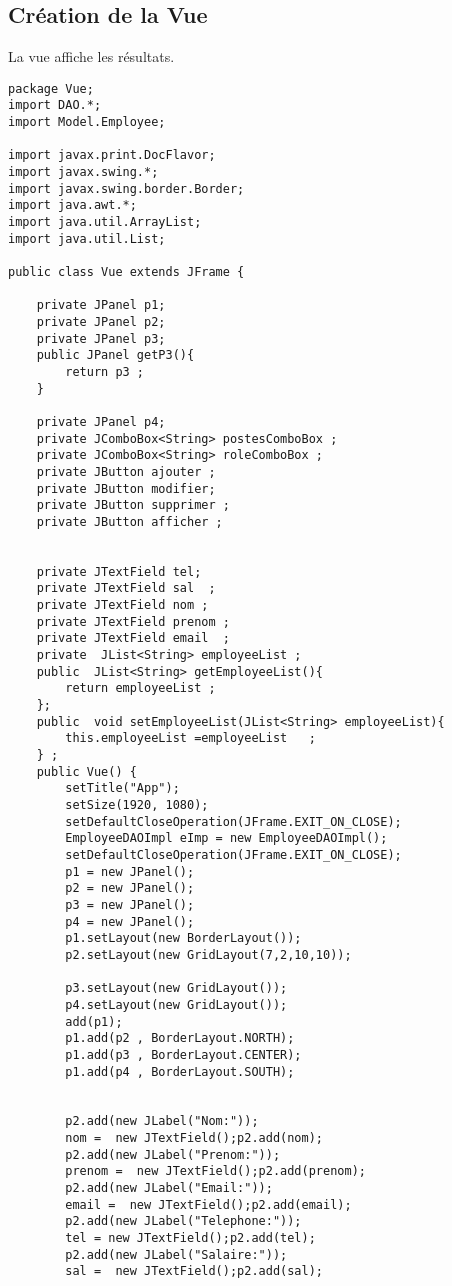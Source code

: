\documentclass[12pt,a4paper]{article}
\begin{document}
\subsection{Création de la Vue}
La vue affiche les résultats.

\begin{lstlisting}
package Vue;
import DAO.*;
import Model.Employee;

import javax.print.DocFlavor;
import javax.swing.*;
import javax.swing.border.Border;
import java.awt.*;
import java.util.ArrayList;
import java.util.List;

public class Vue extends JFrame {

    private JPanel p1;
    private JPanel p2;
    private JPanel p3;
    public JPanel getP3(){
        return p3 ;
    }

    private JPanel p4;
    private JComboBox<String> postesComboBox ;
    private JComboBox<String> roleComboBox ;
    private JButton ajouter ;
    private JButton modifier;
    private JButton supprimer ;
    private JButton afficher ;


    private JTextField tel;
    private JTextField sal  ;
    private JTextField nom ;
    private JTextField prenom ;
    private JTextField email  ;
    private  JList<String> employeeList ;
    public  JList<String> getEmployeeList(){
        return employeeList ;
    };
    public  void setEmployeeList(JList<String> employeeList){
        this.employeeList =employeeList   ;
    } ;
    public Vue() {
        setTitle("App");
        setSize(1920, 1080);
        setDefaultCloseOperation(JFrame.EXIT_ON_CLOSE);
        EmployeeDAOImpl eImp = new EmployeeDAOImpl();
        setDefaultCloseOperation(JFrame.EXIT_ON_CLOSE);
        p1 = new JPanel();
        p2 = new JPanel();
        p3 = new JPanel();
        p4 = new JPanel();
        p1.setLayout(new BorderLayout());
        p2.setLayout(new GridLayout(7,2,10,10));

        p3.setLayout(new GridLayout());
        p4.setLayout(new GridLayout());
        add(p1);
        p1.add(p2 , BorderLayout.NORTH);
        p1.add(p3 , BorderLayout.CENTER);
        p1.add(p4 , BorderLayout.SOUTH);


        p2.add(new JLabel("Nom:"));
        nom =  new JTextField();p2.add(nom);
        p2.add(new JLabel("Prenom:"));
        prenom =  new JTextField();p2.add(prenom);
        p2.add(new JLabel("Email:"));
        email =  new JTextField();p2.add(email);
        p2.add(new JLabel("Telephone:"));
        tel = new JTextField();p2.add(tel);
        p2.add(new JLabel("Salaire:"));
        sal =  new JTextField();p2.add(sal);


\end{lstlisting}
\end{document}
